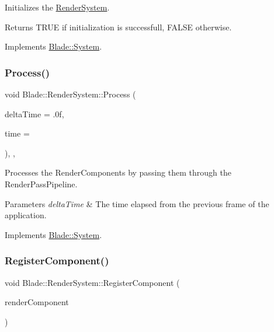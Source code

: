Initializes the \hyperlink{class_blade_1_1_render_system}{Render\+System}. 

\begin{DoxyReturn}{Returns}
T\+R\+UE if initialization is successfull, F\+A\+L\+SE otherwise. 
\end{DoxyReturn}


Implements \hyperlink{class_blade_1_1_system_a63fa00af40dc54d093300eff4785f26f}{Blade\+::\+System}.

\mbox{\label{class_blade_1_1_render_system_a8edd0d0c9d5d54c395a03f98f6b16fb9}} 
\subsubsection{\texorpdfstring{Process()}{Process()}}
{\footnotesize\ttfamily void Blade\+::\+Render\+System\+::\+Process (\begin{DoxyParamCaption}\item[{float}]{delta\+Time = {\ttfamily .0f},  }\item[{long}]{time = {} }\end{DoxyParamCaption})\hspace{0.3cm}{\ttfamily [override]}, {\ttfamily [virtual]}, {\ttfamily [noexcept]}}



Processes the Render\+Components by passing them through the Render\+Pass\+Pipeline. 


\begin{DoxyParams}{Parameters}
{\em delta\+Time} & The time elapsed from the previous frame of the application. \\
\hline
\end{DoxyParams}


Implements \hyperlink{class_blade_1_1_system_a80c186f5f9f8fa4fd317b861853fe6a8}{Blade\+::\+System}.

\mbox{\label{class_blade_1_1_render_system_a36ad263f137b6634542966dea0229047}} 
\subsubsection{\texorpdfstring{Register\+Component()}{RegisterComponent()}}
{\footnotesize\ttfamily void Blade\+::\+Render\+System\+::\+Register\+Component (\begin{DoxyParamCaption}\item[{\hyperlink{class_blade_1_1_render_component}{Render\+Component} $\ast$}]{render\+Component }\end{DoxyParamCaption})\hspace{0.3cm}{\ttfamily [noexcept]}}



